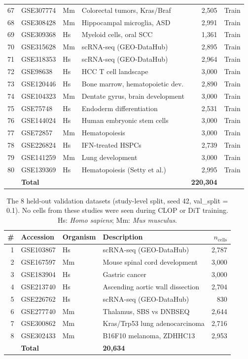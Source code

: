 {\begin{longtable}{rllp{4.2cm}rr}
  67 & GSE307774 & Mm & Colorectal tumors, Kras/Braf & 2,505 & Train \\
  68 & GSE308428 & Mm & Hippocampal microglia, ASD & 2,991 & Train \\
  69 & GSE309368 & Hs & Myeloid cells, oral SCC & 1,361 & Train \\
  70 & GSE315628 & Mm & scRNA-seq (GEO-DataHub) & 2,895 & Train \\
  71 & GSE318353 & Hs & scRNA-seq (GEO-DataHub) & 2,964 & Train \\
  72 & GSE98638  & Hs & HCC T cell landscape & 3,000 & Train \\
  73 & GSE120446 & Hs & Bone marrow, hematopoietic dev. & 2,890 & Train \\
  74 & GSE104323 & Mm & Dentate gyrus, brain development & 3,000 & Train \\
  75 & GSE75748  & Hs & Endoderm differentiation & 2,531 & Train \\
  76 & GSE144024 & Hs & Human embryonic stem cells & 3,000 & Train \\
  77 & GSE72857  & Mm & Hematopoiesis & 3,000 & Train \\
  78 & GSE226824 & Hs & IFN-treated HSPCs & 2,739 & Train \\
  79 & GSE141259 & Mm & Lung development & 3,000 & Train \\
  80 & GSE139369 & Hs & Hematopoiesis (Setty et al.) & 2,995 & Train \\
\midrule
  & \textbf{Total} & & & \textbf{220,304} & \\
\end{longtable}
}%

\begin{table}[!htbp]
\centering
\caption{The 8 held-out validation datasets (study-level split, seed 42, val\_split = 0.1). No cells from these studies were seen during CLOP or DiT training. Hs: \textit{Homo sapiens}; Mm: \textit{Mus musculus}.\label{tab:s2_validation}}
\begin{tabular}{rllp{4.5cm}r}
\toprule
\# & Accession & Organism & Description & $n_{\text{cells}}$ \\
\midrule
  1 & GSE103867 & Hs & scRNA-seq (GEO-DataHub) & 2,787 \\
  2 & GSE167597 & Mm & Mouse spinal cord development & 3,000 \\
  3 & GSE183904 & Hs & Gastric cancer & 3,000 \\
  4 & GSE213740 & Hs & Ascending aortic wall dissection & 2,704 \\
  5 & GSE226762 & Hs & scRNA-seq (GEO-DataHub) & 830 \\
  6 & GSE277740 & Mm & Thalamus, SBS vs DNBSEQ & 2,644 \\
  7 & GSE300862 & Mm & Kras/Trp53 lung adenocarcinoma & 2,716 \\
  8 & GSE302433 & Mm & B16F10 melanoma, ZDHHC13 & 2,953 \\
\midrule
  & \textbf{Total} & & \textbf{20,634} \\
\bottomrule
\end{tabular}
\end{table}

